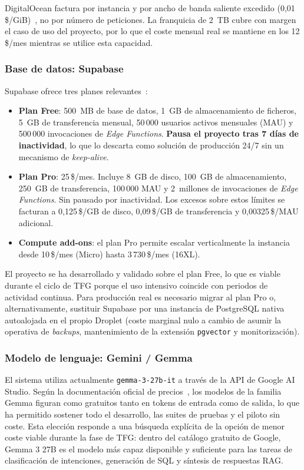 DigitalOcean factura por instancia y por ancho de banda saliente excedido (0,01\,\$/GiB)~\cite{doBandwidth}, no por número de peticiones. La franquicia de 2~TB cubre con margen el caso de uso del proyecto, por lo que el coste mensual real se mantiene en los 12\,\$/mes mientras se utilice esta capacidad.

\subsubsection{Base de datos: Supabase}

Supabase ofrece tres planes relevantes~\cite{supabasePricing}:

\begin{itemize}
    \item \textbf{Plan Free}: 500~MB de base de datos, 1~GB de almacenamiento de ficheros, 5~GB de transferencia mensual, 50\,000 usuarios activos mensuales (MAU) y 500\,000 invocaciones de \textit{Edge Functions}. \textbf{Pausa el proyecto tras 7 días de inactividad}, lo que lo descarta como solución de producción 24/7 sin un mecanismo de \textit{keep-alive}.
    \item \textbf{Plan Pro}: 25\,\$/mes. Incluye 8~GB de disco, 100~GB de almacenamiento, 250~GB de transferencia, 100\,000 MAU y 2~millones de invocaciones de \textit{Edge Functions}. Sin pausado por inactividad. Los excesos sobre estos límites se facturan a 0,125\,\$/GB de disco, 0,09\,\$/GB de transferencia y 0,00325\,\$/MAU adicional.
    \item \textbf{Compute add-ons}: el plan Pro permite escalar verticalmente la instancia desde 10\,\$/mes (Micro) hasta 3\,730\,\$/mes (16XL).
\end{itemize}

El proyecto se ha desarrollado y validado sobre el plan Free, lo que es viable durante el ciclo de TFG porque el uso intensivo coincide con periodos de actividad continua. Para producción real es necesario migrar al plan Pro o, alternativamente, sustituir Supabase por una instancia de PostgreSQL nativa autoalojada en el propio Droplet (coste marginal nulo a cambio de asumir la operativa de \textit{backups}, mantenimiento de la extensión \texttt{pgvector} y monitorización).

\subsubsection{Modelo de lenguaje: Gemini / Gemma}

El sistema utiliza actualmente \texttt{gemma-3-27b-it} a través de la API de Google AI Studio. Según la documentación oficial de precios~\cite{geminiPricing}, los modelos de la familia Gemma figuran como gratuitos tanto en tokens de entrada como de salida, lo que ha permitido sostener todo el desarrollo, las suites de pruebas y el piloto sin coste. Esta elección responde a una búsqueda explícita de la opción de menor coste viable durante la fase de TFG: dentro del catálogo gratuito de Google, Gemma 3 27B es el modelo más capaz disponible y suficiente para las tareas de clasificación de intenciones, generación de SQL y síntesis de respuestas RAG.


